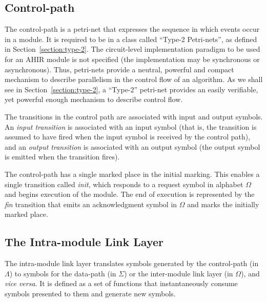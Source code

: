 \documentclass[conference]{IEEEtran}
\begin{document}
\subsection{Control-path}


The control-path is a petri-net that expresses the sequence in which
events occur in a module. It is required to be in a class called
``Type-2 Petri-nets'', as defined in Section~\ref{section:type-2}.
The circuit-level implementation paradigm to be used for an AHIR module is
not specified (the implementation may be synchronous or asynchronous).
Thus, petri-nets provide a neutral, powerful and compact mechanism to 
describe parallelism in the control flow of an algorithm.  
As we shall see in Section~\ref{section:type-2}, a ``Type-2'' petri-net
provides an easily verifiable, yet powerful enough mechanism to
describe control flow.

The transitions in the control path are associated with input and
output symbols.  An {\em input transition} is associated with
an input symbol (that is, the transition is assumed to have fired
when the input symbol is received by the control path), and an {\em output transition}
is associated with an output symbol (the output symbol is emitted
when the transition fires).

The control-path has a single marked place in the initial marking.
This enables a single transition called {\em init}, which responds to
a request symbol in alphabet $\Omega$ and begins execution of the
module. The end of execution is represented by the {\em fin}
transition that emits an acknowledgment symbol in $\Omega$ and marks
the initially marked place.

\subsection{The Intra-module Link Layer}

The intra-module link layer translates symbols generated by the
control-path (in $\Lambda$) to symbols for the data-path (in $\Sigma$)
or the inter-module link layer (in $\Omega$), and \emph{vice versa}.
It is defined as a set of functions that instantaneously consume
symbols presented to them and generate new symbols.
\end{document}
